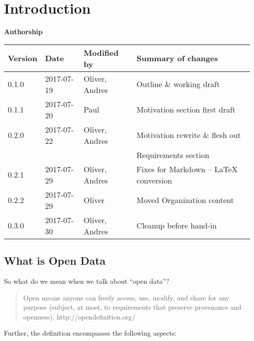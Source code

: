 \section{Introduction}\label{sec:introduction}

\textbf{Authorship}
\vspace*{4mm}

\begin{longtable}{@{}llll@{}}
\toprule
Version & Date & Modified by & Summary of changes \\
\midrule
\endhead
0.1.0 & 2017-07-19 & Oliver, Andres & Outline \& working draft \\
0.1.1 & 2017-07-20 & Paul & Motivation section first draft \\
0.2.0 & 2017-07-22 & Oliver, Andres & Motivation rewrite \& flesh out \\
			&						 &								& Requirements section \\
0.2.1 & 2017-07-29 & Oliver, Andres & Fixes for Markdown -- LaTeX conversion \\
0.2.2 & 2017-07-29 & Oliver & Moved Organization content\\
0.3.0 & 2017-07-30 & Oliver, Andres & Cleanup before hand-in \\
\bottomrule
\end{longtable}

\subsection{What is Open Data}\label{what-is-open-data}

So what do we mean when we talk about ``open data''?

\begin{quotation}
Open means anyone can freely access, use, modify, and share for any
purpose (subject, at most, to requirements that preserve provenance and
openness). http://opendefinition.org/
\end{quotation}

Further, the definition encompasses the following aspects:

